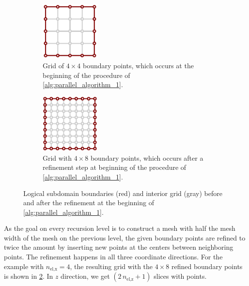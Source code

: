 \begin{figure}%
  \centering%
  \begin{subfigure}[t]{0.48\textwidth}%
    \centering%
    \includegraphics[width=3cm]{images/parallel_fiber_estimation/boundary_grid.pdf}%
   \caption{Grid of $4 \times 4$ boundary points, which occurs at the beginning of the procedure of \cref{alg:parallel_algorithm_1}.}%
    \label{fig:boundary_grid_1}%
  \end{subfigure}
  \quad
  \begin{subfigure}[t]{0.48\textwidth}%
    \centering%
    \includegraphics[width=3cm]{images/parallel_fiber_estimation/boundary_grid_2.pdf}%
    \caption{Grid with $4 \times 8$ boundary points, which occurs after a refinement step at beginning of the procedure of \cref{alg:parallel_algorithm_1}.}%
    \label{fig:boundary_grid_2}%
  \end{subfigure}   
  \caption{Logical subdomain boundaries (red) and interior grid (gray) before and after the refinement at the beginning of \cref{alg:parallel_algorithm_1}.}%
  \label{fig:boundary_grid}%
\end{figure}%

As the goal on every recursion level is to construct a mesh with half the mesh width of the mesh on the previous level, the given boundary points are refined to twice the amount by inserting new points at the centers between neighboring points. The refinement happens in all three coordinate directions. For the example with $n_\text{el,x}=4$, the resulting grid with the $4\times 8$ refined boundary points is shown in \cref{fig:boundary_grid_2}. In $z$ direction, we get $(2\,n_\text{el,z}+1)$ slices with points.

